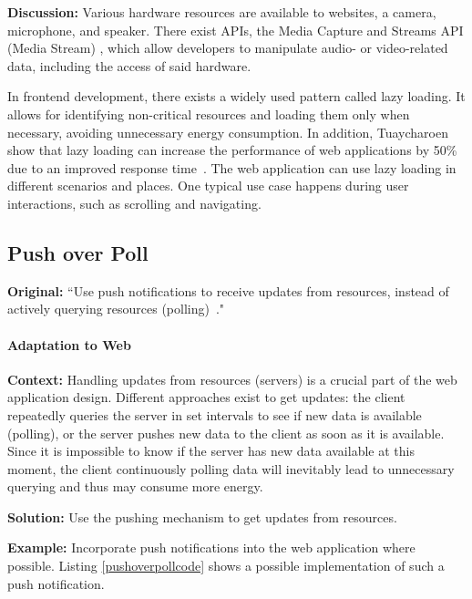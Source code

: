 \textbf{Discussion:} Various hardware resources are available to websites, \eg a camera, microphone, and speaker. There exist APIs, \eg the Media Capture and Streams API (Media Stream) \cite{media-streams-api}, which allow developers to manipulate audio- or video-related data, including the access of said hardware.

In frontend development, there exists a widely used pattern called lazy loading. It allows for identifying non-critical resources and loading them only when necessary, avoiding unnecessary energy consumption. In addition, Tuaycharoen \etal show that lazy loading can increase the performance of web applications by 50\% due to an improved response time~\cite{Tuaycharoen2018}. The web application can use lazy loading in different scenarios and places. One typical use case happens during user interactions, such as scrolling and navigating.



\subsection{Push over Poll} \label{sec:patterns-PushOverPoll}
\textbf{Original:} ``Use push notifications to receive updates from resources, instead of actively querying resources (\ie polling)~\cite{cruz2019catalog}."

\paragraph{Adaptation to Web}\mbox{}

\textbf{Context:} Handling updates from resources (\eg servers) is a crucial part of the web application design. Different approaches exist to get updates: the client repeatedly queries the server in set intervals to see if new data is available (\ie polling), or the server pushes new data to the client as soon as it is available. Since it is impossible to know if the server has new data available at this moment, the client continuously polling data will inevitably lead to unnecessary querying and thus may consume more energy.

\textbf{Solution:} Use the pushing mechanism to get updates from resources.

\textbf{Example:} Incorporate push notifications into the web application where possible. Listing \ref{pushoverpollcode} shows a possible implementation of such a push notification.

